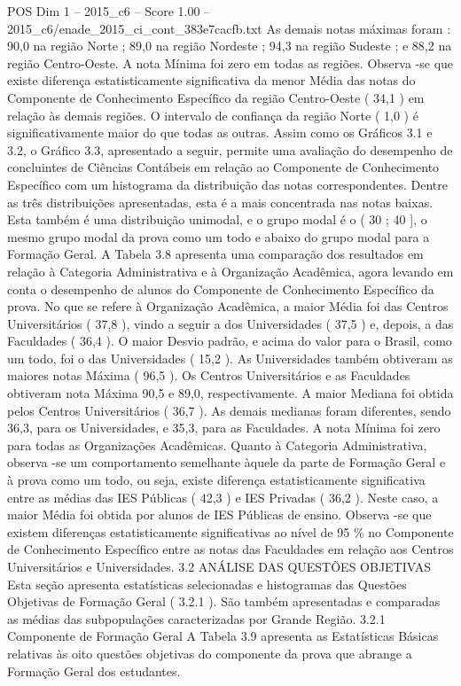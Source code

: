 \begin{textsample}{POS Dim 1 – 2015\_c6 – Score 1.00 – 2015\_c6/enade\_2015\_ci\_cont\_383e7cacfb.txt}
As demais notas máximas foram : 90,0 na região Norte ; 89,0 na região Nordeste ; 94,3 na região Sudeste ; e 88,2 na região Centro-Oeste.
A nota Mínima foi zero em todas as regiões.
Observa -se que existe diferença estatisticamente significativa da menor Média das notas do Componente de Conhecimento Específico da região Centro-Oeste ( 34,1 ) em relação às demais regiões.
O intervalo de confiança da região Norte ( 1,0 ) é significativamente maior do que todas as outras.
Assim como os Gráficos 3.1 e 3.2, o Gráfico 3.3, apresentado a seguir, permite uma avaliação do desempenho de concluintes de Ciências Contábeis em relação ao Componente de Conhecimento Específico com um histograma da distribuição das notas correspondentes.
Dentre as três distribuições apresentadas, esta é a mais concentrada nas notas baixas.
Esta também é uma distribuição unimodal, e o grupo modal é o ( 30 ; 40 ], o mesmo grupo modal da prova como um todo e abaixo do grupo modal para a Formação Geral.
A Tabela 3.8 apresenta uma comparação dos resultados em relação à Categoria Administrativa e à Organização Acadêmica, agora levando em conta o desempenho de alunos do Componente de Conhecimento Específico da prova.
No que se refere à Organização Acadêmica, a maior Média foi das Centros Universitários ( 37,8 ), vindo a seguir a dos Universidades ( 37,5 ) e, depois, a das Faculdades ( 36,4 ).
O maior Desvio padrão, e acima do valor para o Brasil, como um todo, foi o das Universidades ( 15,2 ).
As Universidades também obtiveram as maiores notas Máxima ( 96,5 ).
Os Centros Universitários e as Faculdades obtiveram nota Máxima 90,5 e 89,0, respectivamente.
A maior Mediana foi obtida pelos Centros Universitários ( 36,7 ).
As demais medianas foram diferentes, sendo 36,3, para os Universidades, e 35,3, para as Faculdades.
A nota Mínima foi zero para todas as Organizações Acadêmicas.
Quanto à Categoria Administrativa, observa -se um comportamento semelhante àquele da parte de Formação Geral e à prova como um todo, ou seja, existe diferença estatisticamente significativa entre as médias das IES Públicas ( 42,3 ) e IES Privadas ( 36,2 ).
Neste caso, a maior Média foi obtida por alunos de IES Públicas de ensino.
Observa -se que existem diferenças estatisticamente significativas ao nível de 95 \% no Componente de Conhecimento Específico entre as notas das Faculdades em relação aos Centros Universitários e Universidades. 3.2 ANÁLISE DAS QUESTÕES OBJETIVAS Esta seção apresenta estatísticas selecionadas e histogramas das Questões Objetivas de Formação Geral ( 3.2.1 ).
São também apresentadas e comparadas as médias das subpopulações caracterizadas por Grande Região. 3.2.1 Componente de Formação Geral A Tabela 3.9 apresenta as Estatísticas Básicas relativas às oito questões objetivas do componente da prova que abrange a Formação Geral dos estudantes.

\end{textsample}
